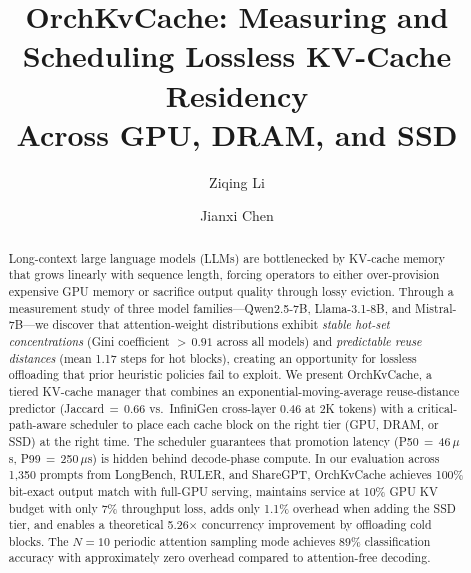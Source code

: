 \documentclass[acmsmall,nonacm,screen]{acmart}
\newcommand{\sys}{OrchKvCache}
\begin{document}
\title{\sys{}: Measuring and Scheduling Lossless KV-Cache Residency\\
       Across GPU, DRAM, and SSD}

\author{Ziqing Li}

\author{Jianxi Chen}

\begin{abstract}
Long-context large language models (LLMs) are bottlenecked by KV-cache memory
that grows linearly with sequence length, forcing operators to either
over-provision expensive GPU memory or sacrifice output quality through lossy
eviction.  Through a measurement study of three model families---Qwen2.5-7B,
Llama-3.1-8B, and Mistral-7B---we discover that attention-weight distributions
exhibit \emph{stable hot-set concentrations} (Gini coefficient ${>}\,0.91$
across all models) and \emph{predictable reuse distances} (mean 1.17 steps for
hot blocks), creating an opportunity for lossless offloading that prior
heuristic policies fail to exploit.  We present \sys{}, a tiered KV-cache
manager that combines an exponential-moving-average reuse-distance predictor
(Jaccard\,$=$\,0.66 vs.\ InfiniGen cross-layer 0.46 at 2K tokens) with a
critical-path-aware scheduler to place each cache block on the right tier
(GPU, DRAM, or SSD) at the right time.  The scheduler guarantees that
promotion latency (P50\,$=$\,46\,$\mu$s, P99\,$=$\,250\,$\mu$s) is hidden
behind decode-phase compute.  In our evaluation across 1{,}350 prompts from
LongBench, RULER, and ShareGPT, \sys{} achieves 100\% bit-exact output
match with full-GPU serving, maintains service at 10\% GPU KV budget with
only 7\% throughput loss, adds only 1.1\% overhead when adding the SSD tier,
and enables a theoretical 5.26$\times$ concurrency improvement by offloading
cold blocks.  The $N{=}10$ periodic attention sampling mode achieves 89\%
classification accuracy with approximately zero overhead compared to
attention-free decoding.
\end{abstract}
\end{document}
